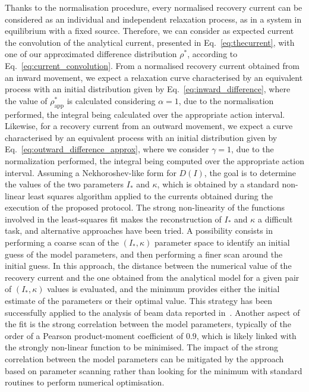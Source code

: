 {Thanks to the normalisation procedure, every normalised recovery current can be considered as an individual and independent relaxation process, as in a system in equilibrium with a fixed source. Therefore, we can consider as expected current the convolution of the analytical current, presented in Eq.~\eqref{eq:thecurrent}, with one of our approximated difference distribution $\rho^\ast$, {according to Eq.~\eqref{eq:current_convolution}}. From a normalised recovery current obtained from an inward movement, we expect a relaxation curve characterised by an equivalent process with an initial distribution given by Eq.~\eqref{eq:inward_difference}, where the value of $\rho^\ast_\text{app}$ is calculated considering $\alpha=1$, due to the normalisation performed, the integral being calculated over the appropriate action interval. Likewise, for a recovery current from an outward movement, we expect a curve characterised by an equivalent process with an initial distribution given by Eq.~\eqref{eq:outward_difference_approx}, where we consider $\gamma=1$, due to the normalization performed, the integral being computed over the appropriate action interval. Assuming a Nekhoroshev-like form for $D(I)$, the goal is to determine the values of the two parameters $I_\ast$ and $\kappa$, which is obtained by a standard non-linear least squares algorithm applied to the currents obtained during the execution of the proposed protocol. {The strong non-linearity of the functions involved in the least-squares fit makes the reconstruction of $I_\ast$ and $\kappa$ a difficult task, and alternative approaches have been tried. A possibility consists in performing a coarse scan of the $(I_\ast, \kappa)$ parameter space to identify an initial guess of the model parameters, and then performing a finer scan around the initial guess. In this approach, the distance between the numerical value of the recovery current and the one obtained from the analytical model for a given pair of $(I_\ast, \kappa)$ values is evaluated, and the minimum provides either the initial estimate of the parameters or their optimal value. This strategy has been successfully applied to the analysis of beam data reported in~\cite{montanari:ipac22-mopost043}. Another aspect of the fit is the strong correlation between the model parameters, typically of the order of a Pearson product-moment coefficient of $0.9$, which is likely linked with the strongly non-linear function to be minimised. The impact of the strong correlation between the model parameters can be mitigated by the approach based on parameter scanning rather than looking for the minimum with standard routines to perform numerical optimisation.}

}
